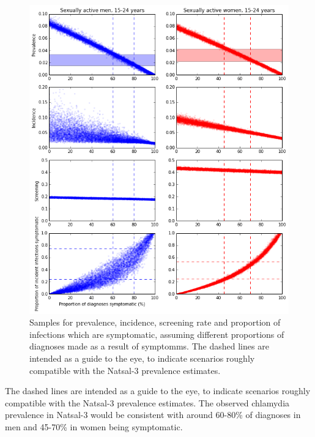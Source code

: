 \documentclass{article}
\begin{document}
    \begin{figure}
        \begin{center}\includegraphics[width=15cm]{england_files/england_32_1.png}\end{center}
        \caption{Samples for prevalence, incidence, screening rate and proportion of infections which are symptomatic, assuming different proportions of diagnoses made as a result of symptomms. The dashed lines are intended as a guide to the eye, to indicate scenarios roughly compatible with the Natsal-3 prevalence estimates.}
        \label{fig:prev_samples_byage}
    \end{figure}
    
    The dashed lines are intended as a guide to the eye, to indicate
scenarios roughly compatible with the Natsal-3 prevalence estimates. The
observed chlamydia prevalence in Natsal-3 would be consistent with
around 60-80\% of diagnoses in men and 45-70\% in women being
symptomatic.
\end{document}
